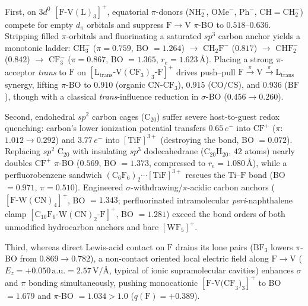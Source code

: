 \documentclass[10pt,twocolumn]{article}
\begin{document}
First, on $3d^0$ $[\mathrm{F\text{-}V(L)_3}]^+$, equatorial $\pi$-donors ($\mathrm{NH}_2^-$, $\mathrm{OMe}^-$, $\mathrm{Ph}^-$, $\mathrm{CH{=}CH}_2^-$) compete for empty $d_\pi$ orbitals and suppress $\mathrm{F}\to\mathrm{V}$ $\pi$-BO to $0.518$--$0.636$. Stripping filled $\pi$-orbitals and fluorinating a saturated $sp^3$ carbon anchor yields a monotonic ladder: $\mathrm{CH}_3^-$ ($\pi = 0.759$, BO $= 1.264$) $\to$ $\mathrm{CH}_2\mathrm{F}^-$ ($0.817$) $\to$ $\mathrm{CHF}_2^-$ ($0.842$) $\to$ $\mathrm{CF}_3^-$ ($\pi = 0.867$, BO $= 1.365$, $r_e = 1.623\,$\AA). Placing a strong $\pi$-acceptor \textit{trans} to $\mathrm{F}$ on $[\mathrm{L}_{\mathrm{trans}}\text{-}\mathrm{V}(\mathrm{CF}_3)_3\text{-}\mathrm{F}]^+$ drives push--pull $\mathrm{F}\xrightarrow{\pi}\mathrm{V}\xrightarrow{\pi}\mathrm{L}_{\mathrm{trans}}$ synergy, lifting $\pi$-BO to $0.910$ (organic $\mathrm{CN\text{-}CF}_3$), $0.915$ ($\mathrm{CO}/\mathrm{CS}$), and $0.936$ ($\mathrm{BF}$), though with a classical \textit{trans}-influence reduction in $\sigma$-BO ($0.456 \to 0.260$).

Second, endohedral $sp^2$ carbon cages ($\mathrm{C}_{20}$) suffer severe host-to-guest redox quenching: carbon's lower ionization potential transfers $0.65\,e^-$ into $\mathrm{CF}^+$ ($\pi$: $1.012 \to 0.292$) and $3.77\,e^-$ into $[\mathrm{TiF}]^{3+}$ (destroying the bond, BO $= 0.072$). Replacing $sp^2$ $\mathrm{C}_{20}$ with insulating $sp^3$ dodecahedrane ($\mathrm{C}_{20}\mathrm{H}_{20}$, $42$ atoms) nearly doubles $\mathrm{CF}^+$ $\pi$-BO ($0.569$, BO $= 1.373$, compressed to $r_e = 1.080\,$\AA), while a perfluorobenzene sandwich $(\mathrm{C}_6\mathrm{F}_6)_2\cdots[\mathrm{TiF}]^{3+}$ rescues the $\mathrm{Ti\text{--}F}$ bond (BO $= 0.971$, $\pi = 0.510$). Engineered $\sigma$-withdrawing/$\pi$-acidic carbon anchors ($[\mathrm{F\text{-}W(CN)_4}]^+$, BO $= 1.343$; perfluorinated intramolecular \textit{peri}-naphthalene clamp $[\mathrm{C}_{10}\mathrm{F}_6\text{-}\mathrm{W}(\mathrm{CN})_2\text{-}\mathrm{F}]^+$, BO $= 1.281$) exceed the bond orders of both unmodified hydrocarbon anchors and bare $[\mathrm{WF}_5]^+$.

Third, whereas direct Lewis-acid contact on $\mathrm{F}$ drains its lone pairs ($\mathrm{BF}_3$ lowers $\pi$-BO from $0.869 \to 0.782$), a non-contact oriented local electric field along $\mathrm{F}\to\mathrm{V}$ ($E_z = +0.050\,\mathrm{a.u.} = 2.57\,\mathrm{V}/$\AA, typical of ionic supramolecular cavities) enhances $\sigma$ and $\pi$ bonding simultaneously, pushing monocationic $[\mathrm{F\text{-}V(CF}_3)_3]^+$ to BO $= 1.679$ and $\pi$-BO $= 1.034 > 1.0$ ($q(\mathrm{F}) = +0.389$).
\end{document}
